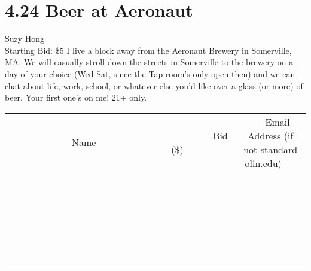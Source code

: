 \documentclass[11pt]{article}
\begin{document}
\section*{4.24 Beer at Aeronaut}
Suzy Hong
\\
Starting Bid: \$5
\newline
I live a block away from the Aeronaut Brewery in Somerville, MA. We will casually stroll down the streets in Somerville to the brewery on a day of your choice (Wed-Sat, since the Tap room's only open then) and we can chat about life, work, school, or whatever else you'd like over a glass (or more) of beer. Your first one's on me! 21+ only.
\\[6ex]
\begin{tabular}{c c c}
~~~~~~~~~~~~~Name~~~~~~~~~~~~~ & ~~~~~~~~~Bid (\$)~~~~~~~~~  & ~~~Email Address (if not standard olin.edu)~~~\\
 & & \\
\hline
 & & \\
\hline
 & & \\
\hline
 & & \\
\hline
 & & \\
\hline
 & & \\
\hline
 & & \\
\hline
 & & \\
\hline
 & & \\
\hline
 & & \\
\hline
 & & \\
\hline
 & & \\
\hline
 & & \\
\hline
 & & \\
\hline
 & & \\
\hline
 & & \\
\hline
 & & \\
\hline
 & & \\
\hline
 & & \\
\hline
 & & \\
\hline
 & & \\
\hline
 & & \\
\hline
 & & \\
\hline
 & & \\
\hline
 & & \\
\hline
 & & \\
\hline
\end{tabular}
\newpage
\end{document}
